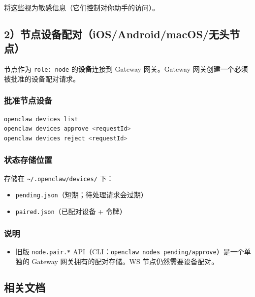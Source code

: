 将这些视为敏感信息（它们控制对你助手的访问）。

\subsection{2）节点设备配对（iOS/Android/macOS/无头节点）}


节点作为 \texttt{role: node} 的\textbf{设备}连接到 Gateway 网关。Gateway 网关创建一个必须被批准的设备配对请求。

\subsubsection{批准节点设备}


\begin{lstlisting}[language=bash]
openclaw devices list
openclaw devices approve <requestId>
openclaw devices reject <requestId>
\end{lstlisting}


\subsubsection{状态存储位置}


存储在 \texttt{\textasciitilde{}/.openclaw/devices/} 下：

\begin{itemize}
  \item \texttt{pending.json}（短期；待处理请求会过期）
  \item \texttt{paired.json}（已配对设备 + 令牌）
\end{itemize}


\subsubsection{说明}


\begin{itemize}
  \item 旧版 \texttt{node.pair.*} API（CLI：\texttt{openclaw nodes pending/approve}）是一个单独的 Gateway 网关拥有的配对存储。WS 节点仍然需要设备配对。
\end{itemize}


\subsection{相关文档}


